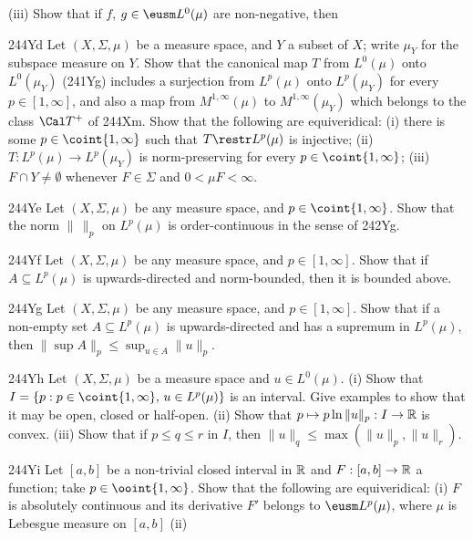 {

\noindent(iii) Show that
if $f$, $g\in\eusm L^0(\mu)$ are non-negative, then


\spheader 244Yd
Let $(X,\Sigma,\mu)$ be a measure space, and $Y$ a subset
of $X$;  write $\mu_Y$ for the subspace measure on $Y$.   Show that the
canonical map $T$ from $L^0(\mu)$ onto $L^0(\mu_Y)$ (241Yg) includes a
surjection from $L^p(\mu)$ onto $L^p(\mu_Y)$ for every $p\in[1,\infty]$,
and also a map from $M^{1,\infty}(\mu)$ to $M^{1,\infty}(\mu_Y)$ which
belongs to the class $\Cal T^+$ of 244Xm.   Show that the
following are equiveridical:  (i)  there is some $p\in\coint{1,\infty}$
such that $T\restr L^p(\mu)$ is
injective;  (ii) $T:L^p(\mu)\to L^p(\mu_Y)$ is
norm-preserving for every $p\in\coint{1,\infty}$;    (iii)
$F\cap Y\ne\emptyset$ whenever $F\in\Sigma$ and $0<\mu F<\infty$.

\spheader 244Ye
 Let $(X,\Sigma,\mu)$ be any measure space, and
$p\in\coint{1,\infty}$.   Show that the norm $\|\,\|_p$ on $L^p(\mu)$ is
order-continuous in the sense of 242Yg.

\spheader 244Yf
 Let $(X,\Sigma,\mu)$ be any measure space, and
$p\in[1,\infty]$.   Show that if $A\subseteq L^p(\mu)$ is
upwards-directed and norm-bounded, then it is bounded above.

\spheader 244Yg
 Let $(X,\Sigma,\mu)$ be any measure space, and
$p\in[1,\infty]$.   Show that if a non-empty set $A\subseteq L^p(\mu)$
is upwards-directed and has a supremum in $L^p(\mu)$, then
$\|\sup A\|_p\le\sup_{u\in A}\|u\|_p$.   

\spheader 244Yh
 Let $(X,\Sigma,\mu)$ be a measure space and
$u\in L^0(\mu)$.   (i) Show that
$I=\{p:p\in\coint{1,\infty},\,u\in L^p(\mu)\}$ is
an interval.   Give examples to show that it may be open, closed or
half-open.   (ii) Show that $p\mapsto p\ln\|u\|_p:I\to\Bbb R$ is convex.
(iii) Show that if $p\le q\le r$ in $I$, then
$\|u\|_q\le\max(\|u\|_p,\|u\|_r)$.

\spheader 244Yi
 Let $[a,b]$ be a non-trivial closed interval in $\Bbb R$
and $F:[a,b]\to\Bbb R$ a function;  take $p\in\ooint{1,\infty}$.   Show
that the following are equiveridical:   (i) $F$ is absolutely continuous
and its derivative $F'$ belongs to $\eusm L^p(\mu)$, where $\mu$ is
Lebesgue measure on $[a,b]$  (ii)

}
